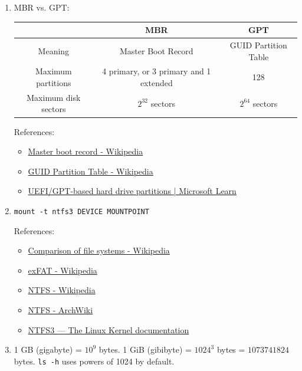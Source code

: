 \documentclass[12pt, a4paper]{article}
\begin{document}
\begin{enumerate}[label=(\alph*)]
    \item MBR vs. GPT:
      \begin{table}[H]
        \centering
        \begin{tabular}{|c|c|c|}
        \hline
        & \textbf{MBR} & \textbf{GPT}\\\hline
        Meaning & Master Boot Record & GUID Partition Table \\\hline
        Maximum partitions & 4 primary, or 3 primary and  1 extended & 128 \\\hline
        Maximum disk sectors & $2^{32}$ sectors & $2^{64}$ sectors \\\hline
        \end{tabular}
      \end{table}

      References:
      \begin{itemize}
        \item \href{https://en.wikipedia.org/wiki/Master_boot_record}{Master boot record - Wikipedia}
        \item \href{https://en.wikipedia.org/wiki/GUID_Partition_Table#History}{GUID Partition Table - Wikipedia}
        \item \href{https://learn.microsoft.com/en-us/windows-hardware/manufacture/desktop/configure-uefigpt-based-hard-drive-partitions}{UEFI/GPT-based hard drive partitions | Microsoft Learn}
      \end{itemize}

    \item \verb|mount -t ntfs3 DEVICE MOUNTPOINT|

      References:
      \begin{itemize}
        \item \href{https://en.wikipedia.org/wiki/Comparison_of_file_systems}{Comparison of file systems - Wikipedia}
        \item \href{https://en.wikipedia.org/wiki/ExFAT}{exFAT - Wikipedia}
        \item \href{https://en.wikipedia.org/wiki/NTFS}{NTFS - Wikipedia}
        \item \href{https://wiki.archlinux.org/title/NTFS}{NTFS - ArchWiki}
        \item \href{https://docs.kernel.org/filesystems/ntfs3.html}{NTFS3 — The Linux Kernel  documentation}
      \end{itemize}

    \item 1 GB (gigabyte) = $10^9$ bytes. 1 GiB (gibibyte) = $1024^3$ bytes = $1073741824$ bytes.
      \verb|ls -h| uses powers of 1024 by default.


\end{enumerate}
\end{document}

